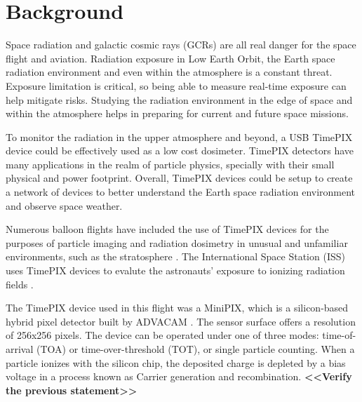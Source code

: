 %
%

\section{Background}
\label{Background}
Space radiation and galactic cosmic rays (GCRs) are all real danger for the space flight and aviation.  Radiation exposure in Low Earth Orbit, the Earth space radiation environment and even within the atmosphere is a constant threat. Exposure limitation is critical, so being able to measure real-time exposure can help mitigate risks.  Studying the radiation environment in the edge of space and within the atmosphere helps in preparing for current and future space missions.  

To monitor the radiation in the upper atmosphere and beyond, a USB TimePIX device could be effectively used as a low cost dosimeter.  TimePIX detectors have many applications in the realm of particle physics, specially with their small physical and power footprint. Overall, TimePIX devices could be setup to create a network of devices to better understand the Earth space radiation environment and observe space weather.

%
Numerous balloon flights have included the use of TimePIX devices for the purposes of particle imaging and radiation dosimetry in unusual and unfamiliar environments, such as the stratosphere \cite{bexus}. 
%
The International Space Station (ISS) uses TimePIX devices to evalute the astronauts' exposure to ionizing radiation fields \cite{timepix}.

The TimePIX device used in this flight was a MiniPIX, which is a silicon-based hybrid pixel detector built by ADVACAM \cite{advacam}. 
%
The sensor surface offers a resolution of 256x256 pixels.
%
The device can be operated under one of three modes: time-of-arrival (TOA) or time-over-threshold (TOT), or single particle counting. 
%
When a particle ionizes with the silicon chip, the deposited charge is depleted by a bias voltage in a process known as Carrier generation and recombination. \textbf{<<Verify the previous statement>>}

